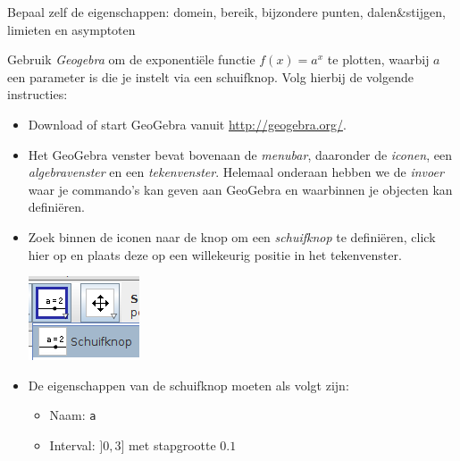 \documentclass[12pt,twoside,a4paper]{article}
\begin{document}
Bepaal zelf de eigenschappen: domein, bereik, bijzondere punten, dalen\&stijgen, limieten en asymptoten

\begin{oefening}
Gebruik {\em Geogebra} om de exponentiële functie $f(x)=a^x$ te plotten, waarbij $a$ een parameter is die je instelt via een schuifknop. Volg hierbij de volgende instructies:
\begin{itemize}
  \item Download of start GeoGebra vanuit \url{http://geogebra.org/}.
  \item Het GeoGebra venster bevat bovenaan de {\em menubar}, daaronder de {\em iconen}, een {\em algebravenster} en een {\em tekenvenster}. Helemaal onderaan hebben we de {\em invoer} waar je commando's kan geven aan GeoGebra en waarbinnen je objecten kan definiëren.
  \item
  \begin{minipage}[t]{0.5\textwidth}
  \vspace{0pt}
  Zoek binnen de iconen naar de knop om een {\em schuifknop} te definiëren, click hier op en plaats deze op een willekeurig positie in het tekenvenster.
  \end{minipage}
  \begin{minipage}[t]{0.5\textwidth}
  \vspace{0pt}
  \begin{center}
    \includegraphics{gg_schuifknop_icoon}
  \end{center}
  \end{minipage}
  \item
  \begin{minipage}[t]{0.3\textwidth}
  \vspace{0pt}
  De eigenschappen van de schuifknop moeten als volgt zijn:
  \begin{itemize}
    \item Naam: \verb#a#
    \item Interval: $]0,3]$ met stapgrootte $0.1$
  \end{itemize}
  \end{minipage}
  \begin{minipage}[t]{0.7\textwidth}
  \vspace{0pt}
  \begin{center}

\end{center}
\end{minipage}
\end{itemize}
\end{oefening}
\end{document}
